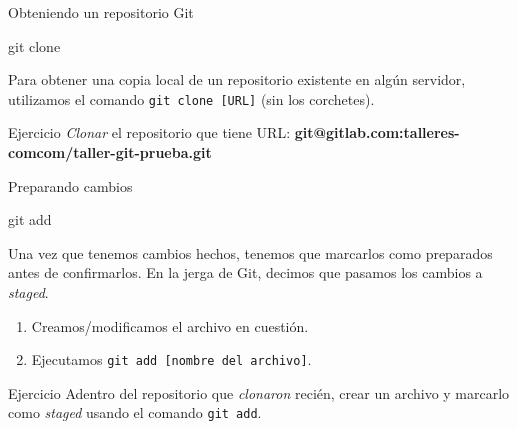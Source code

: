 \begin{frame}[t]{Obteniendo un repositorio Git}

    \begin{comando}
        git clone
    \end{comando}

    \pause
	\begin{block}{}
        Para obtener una copia local de un repositorio existente en algún servidor,
        utilizamos el comando \texttt{git clone [URL]} (sin los corchetes).
    \end{block}

    \pause
    \vspace{1em}
    \begin{ejercicio}{Ejercicio}
        \textit{Clonar} el repositorio que tiene URL: \textbf{git@gitlab.com:talleres-comcom/taller-git-prueba.git}
    \end{ejercicio}
\end{frame}

\begin{frame}[t]{Preparando cambios}
    \begin{comando}
        git add
    \end{comando}

    \pause
    \begin{block}{}
        Una vez que tenemos cambios hechos, tenemos que marcarlos como preparados antes de confirmarlos. En la jerga de Git, decimos que pasamos los cambios a \textit{staged}.
        \begin{enumerate}
            \item Creamos/modificamos el archivo en cuestión.
            \item Ejecutamos \texttt{git add [nombre del archivo]}.
        \end{enumerate}
    \end{block}

    \pause
    \vspace{1em}
    \begin{ejercicio}{Ejercicio}
        Adentro del repositorio que \textit{clonaron} recién, crear un archivo y
        marcarlo como \textit{staged} usando el comando \texttt{git add}.
    \end{ejercicio}
\end{frame}

